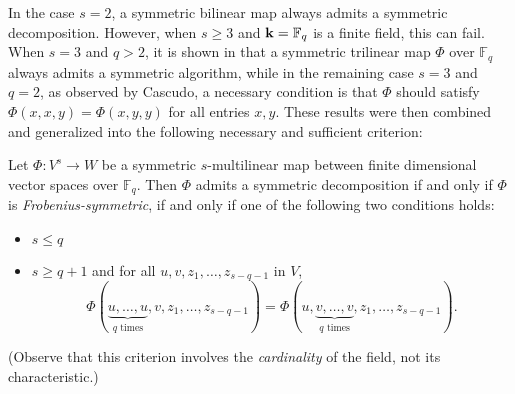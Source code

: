 \documentclass[11pt]{article}
\begin{document}
In the case $s=2$, a symmetric bilinear map always admits a symmetric decomposition.
However, when $s\geq3$ and $\mathbf{k}=\mathbb{F}_q$ is a finite field, this can fail.
When $s=3$ and $q>2$, it is shown in \cite[Lemma~7]{SL84} that a symmetric trilinear map $\Phi$ over $\mathbb{F}_q$ always admits a symmetric algorithm,
while in the remaining case $s=3$ and $q=2$, as observed by Cascudo,
a necessary condition is that $\Phi$ should satisfy $\Phi(x,x,y)=\Phi(x,y,y)$
for all entries $x,y$.
These results were then combined and generalized into the following necessary and sufficient criterion:
\begin{thm}\label{criterion}
Let $\Phi:V^s\to W$ be a symmetric $s$-multilinear map between finite dimensional vector spaces over $\mathbb{F}_q$.
Then $\Phi$ admits a symmetric decomposition if and only if $\Phi$ is \emph{Frobenius-symmetric},
\ie if and only if one of the following two conditions holds:
\begin{itemize}
\item $s\leq q$
\item $s\geq q+1$ and for all $u,v,z_1,\dots,z_{s-q-1}$ in $V$,
\[
\Phi(\underset{\textrm{$q$ times}}{\underbrace{u,\dots,u}},v,z_1,\dots,z_{s-q-1})=\Phi(u,\underset{\textrm{$q$ times}}{\underbrace{v,\dots,v}},z_1,\dots,z_{s-q-1}).
\]
\end{itemize}
(Observe that this criterion involves the \emph{cardinality} of the field, not its characteristic.)
\end{thm}
\end{document}
